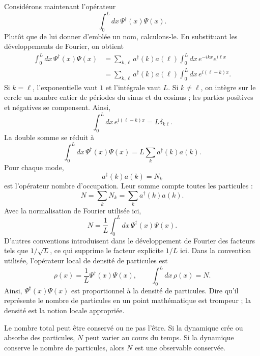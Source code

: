 Considérons maintenant l’opérateur
\begin{equation}
\int_0^L dx\,\Psi^\dagger(x)\Psi(x).
\end{equation}
Plutôt que de lui donner d’emblée un nom, calculons-le. En substituant les développements de Fourier, on obtient
\begin{align}
\int_0^L dx\,\Psi^\dagger(x)\Psi(x)
&=
\sum_{k,\ell}a^\dagger(k)a(\ell)
\int_0^L dx\,e^{-ikx}e^{i\ell x}
\\
&=
\sum_{k,\ell}a^\dagger(k)a(\ell)
\int_0^L dx\,e^{i(\ell-k)x}.
\end{align}
Si \(k=\ell\), l’exponentielle vaut \(1\) et l’intégrale vaut \(L\). Si \(k\ne\ell\), on intègre sur le cercle un nombre entier de périodes du sinus et du cosinus ; les parties positives et négatives se compensent. Ainsi,
\begin{equation}
\int_0^L dx\,e^{i(\ell-k)x}=L\delta_{k\ell}.
\end{equation}
La double somme se réduit à
\begin{equation}
\int_0^L dx\,\Psi^\dagger(x)\Psi(x)
=L\sum_k a^\dagger(k)a(k).
\end{equation}
Pour chaque mode,
\begin{equation}
a^\dagger(k)a(k)=N_k
\end{equation}
est l’opérateur nombre d’occupation. Leur somme compte toutes les particules :
\begin{equation}
N=\sum_k N_k=\sum_k a^\dagger(k)a(k).
\end{equation}
Avec la normalisation de Fourier utilisée ici,
\begin{equation}
N=\frac{1}{L}\int_0^L dx\,
\Psi^\dagger(x)\Psi(x).
\end{equation}
D’autres conventions introduisent dans le développement de Fourier des facteurs tels que \(1/\sqrt{L}\), ce qui supprime le facteur explicite \(1/L\) ici. Dans la convention utilisée, l’opérateur local de densité de particules est
\begin{equation}
\rho(x)=\frac{1}{L}\Psi^\dagger(x)\Psi(x),
\qquad
\int_0^L dx\,\rho(x)=N.
\end{equation}
Ainsi, \(\Psi^\dagger(x)\Psi(x)\) est proportionnel à la densité de particules. Dire qu’il représente le nombre de particules en un point mathématique est trompeur ; la densité est la notion locale appropriée.

Le nombre total peut être conservé ou ne pas l’être. Si la dynamique crée ou absorbe des particules, \(N\) peut varier au cours du temps. Si la dynamique conserve le nombre de particules, alors \(N\) est une observable conservée.

